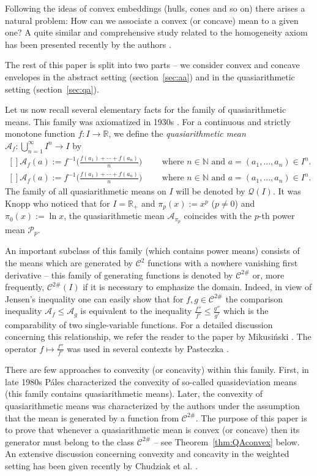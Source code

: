 \documentclass[12pt,oneside]{amsart}
\theoremstyle{definition}
\numberwithin{equation}{section}
\def\Eq#1#2{\ifthenelse{\equal{#1}{*}}
  {\begin{equation*}\begin{aligned}[]#2\end{aligned}\end{equation*}}
  {\begin{equation}\begin{aligned}[]\label{#1}#2\end{aligned}\end{equation}}}
\def\A{\mathscr{A}}
\def\P{\mathscr{P}}
\def\Cts{\mathcal{C}^{2\#}}
\def\C{\mathcal{C}}
\def\calQ{\mathcal{Q}}
\newcommand\R{\mathbb{R}}
\newcommand\N{\mathbb{N}}
\newcommand{\QA}[1]{\A_{#1}}
\begin{document}
Following the ideas of convex embeddings (hulls, cones and so on) there arises a natural problem: How can we associate a convex (or concave) mean to a given one? A quite similar and comprehensive study related to the homogeneity axiom has been presented recently by the authors \cite{PalPas19a}. 

The rest of this paper is split into two parts -- we consider convex and concave envelopes in the abstract setting (section~\ref{sec:aa}) and in the quasiarithmetic setting (section~\ref{sec:qa}). 

\medskip
Let us now recall several elementary facts for the family of quasiarithmetic means.
This family was axiomatized in 1930s \cite{Kol30,Nag30,Def31}. For a continuous and strictly monotone function $f \colon I \to \R$, we define the \emph{quasiarithmetic mean} $\QA{f} \colon \bigcup_{n=1}^\infty I^n \to I$ by
\Eq{*}{
\QA{f}(a):=f^{-1} \bigg( \frac{f(a_1)+\cdots+f(a_n)}n \bigg)\qquad \text{ where }n \in \N \text{ and }a=(a_1,\dots,a_n) \in I^n.
}
The family of all quasiarithmetic means on $I$ will be denoted by $\calQ(I)$. It was Knopp \cite{Kno28} who noticed that for $I=\R_+$ and $\pi_p(x):=x^p$ ($p\ne 0$) and $\pi_0(x):=\ln x$, the quasiarithmetic mean $\QA{\pi_p}$ coincides with the $p$-th power mean $\P_p$.

An important subclass of this family (which contains power means) consists of the means which are generated by $\C^2$ functions with a nowhere vanishing first derivative -- this family of generating functions is denoted by $\Cts$ or, more frequently, $\Cts(I)$ if it is necessary to emphasize the domain. Indeed, in view of Jensen's inequality one can easily show that for $f,g \in \Cts$ the comparison inequality $\QA{f}\le\QA{g}$ is equivalent to the inequality $\tfrac{f''}{f'}\le\tfrac{g''}{g'}$ which is the comparability of two single-variable functions. For a detailed discussion concerning this relationship, we refer the reader to the paper by Mikusi\'nski \cite{Mik48}. The operator $f\mapsto\tfrac{f''}{f'}$ was used in several contexts by Pasteczka \cite{Pas13,Pas15d,Pas18c,Pas20a}.


There are few approaches to convexity (or concavity) within this family. First, in late 1980s P\'ales \cite{Pal88a} characterized the convexity of so-called quasideviation means (this family contains quasiarithmetic means). Later, the convexity of quasiarithmetic means was characterized by the authors \cite{PalPas18a} under the assumption that the mean is generated by a function from $\Cts$. The purpose of this paper is to prove that whenever a quasiarithmetic mean is convex (or concave) then its generator must belong to the class $\Cts$ -- see Theorem~\ref{thm:QAconvex} below. An extensive discussion concerning convexity and concavity in the weighted setting has been given recently by Chudziak et al. \cite{ChuGlaJarJar19}. 
\end{document}
